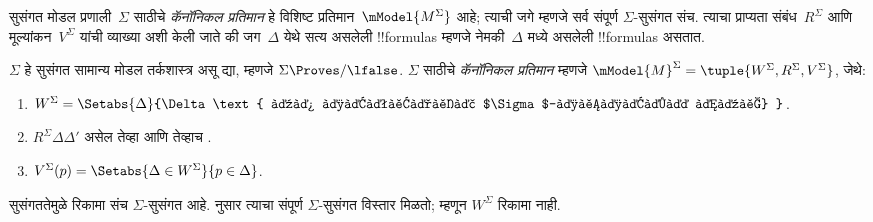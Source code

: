 \documentclass[../../../include/open-logic-section]{subfiles}
\begin{document}


सुसंगत मोडल प्रणाली~$\Sigma$ साठीचे \emph{कॅनॉनिकल प्रतिमान}
हे विशिष्ट प्रतिमान~$\mModel{M^\Sigma}$ आहे; त्याची
जगे म्हणजे सर्व संपूर्ण $\Sigma$-सुसंगत संच.
त्याचा प्राप्यता संबंध~$R^\Sigma$ आणि
मूल्यांकन~$V^\Sigma$ यांची व्याख्या अशी केली
जाते की जग~$\Delta$ येथे सत्य असलेली
!!{formula}s म्हणजे नेमकी~$\Delta$ मध्ये
असलेली !!{formula}s असतात.

\begin{defn}
  $\Sigma$ हे सुसंगत सामान्य मोडल तर्कशास्त्र असू द्या,
  म्हणजे $\Sigma \Proves/ \lfalse$.
  $\Sigma$ साठीचे \emph{कॅनॉनिकल प्रतिमान}
  म्हणजे $\mModel{M}^\Sigma = \tuple{W^\Sigma, R^\Sigma,
    V^\Sigma}$, जेथे:
  \begin{enumerate}
  \item $W^\Sigma = \Setabs{ \Delta }{\Delta \text{
      हा संपूर्ण $\Sigma$-सुसंगत आहे} }$.
  \item $R^\Sigma \Delta\Delta'$ असेल तेव्हा आणि
    तेव्हाच .
  \item $V^\Sigma(p) = \Setabs{\Delta \in W^\Sigma}{p \in \Delta}$.
  \end{enumerate}
  सुसंगततेमुळे रिकामा संच $\Sigma$-सुसंगत आहे.
   नुसार त्याचा संपूर्ण
  $\Sigma$-सुसंगत विस्तार मिळतो; म्हणून $W^\Sigma$ रिकामा नाही.
\end{defn}
\end{document}

